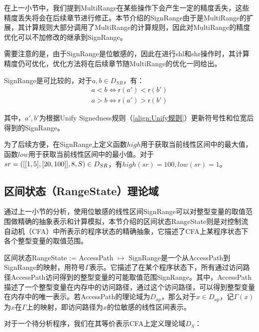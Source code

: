 在上一小节中，我们提到MultiRange在某些操作下会产生一定的精度丢失，这些精度丢失将会在后续章节进行修正。本节介绍的SignRange由于是MultiRange的扩展，其计算规则大部分调用了MultiRange的计算规则，因此对MultiRange的精度优化可以不加修改的继承到SignRange。

需要注意的是，由于SignRange是位敏感的，因此在进行shl和shr操作时，其计算精度仍可优化，优化方法将在后续章节随MultiRange的优化一同给出。

SignRange是可比较的，对于$ a, b \in D_{SR} $，有：\begin{align}
	a < b \iff \mathsf{r}(a') < \mathsf{r}(b')\\
	a > b \iff \mathsf{r}(a') > \mathsf{r}(b')
\end{align}

其中，$ a', b' $为根据Unify Signedness规则（\ref{align:Unify规则}）更新符号性和位宽后得到的SignRange。

为了后续方便，在SignRange上定义函数$ high $用于获取当前线性区间中的最大值，函数$ low $用于获取当前线性区间中的最小值。对于$ sr = ([[1, 5], [20, 100]],8,\\ S) \in D_{SR} $，有$ high(sr) = 100, low(sr) = 1 $。

\subsection{区间状态（RangeState）理论域}
\label{sec:RangeState}

通过上一小节的分析，使用位敏感的线性区间SignRange可以对整型变量的取值范围做精确的抽象表示和计算模拟，本节介绍的区间状态RangeState则是对控制流自动机（CFA）中所表示的程序状态的精确抽象，它描述了CFA上某程序状态下各个整型变量的取值范围。

区间状态RangeState := AccessPath $ \mapsto $ SignRange是一个从AccessPath到SignRange的映射，用符号$ \Gamma $表示。它描述了在某个程序状态下，所有通过访问路径AccessPath访问得到的整型变量的可能取值范围SignRange。其中，AccessPath描述了一个整型变量在内存中的访问路径，通过这个访问路径，可以得到整型变量在内存中的唯一表示。若AccessPath的理论域为$ D_{ap} $，那么对于$ x \in D_{ap}$，记$ \Gamma(x) $为$ x $在$ \Gamma $上的映射，即访问路径为$ x $的位敏感的线性区间表示。

对于一个待分析程序，我们在其等价表示CFA上定义理论域$ D_{S} $：

